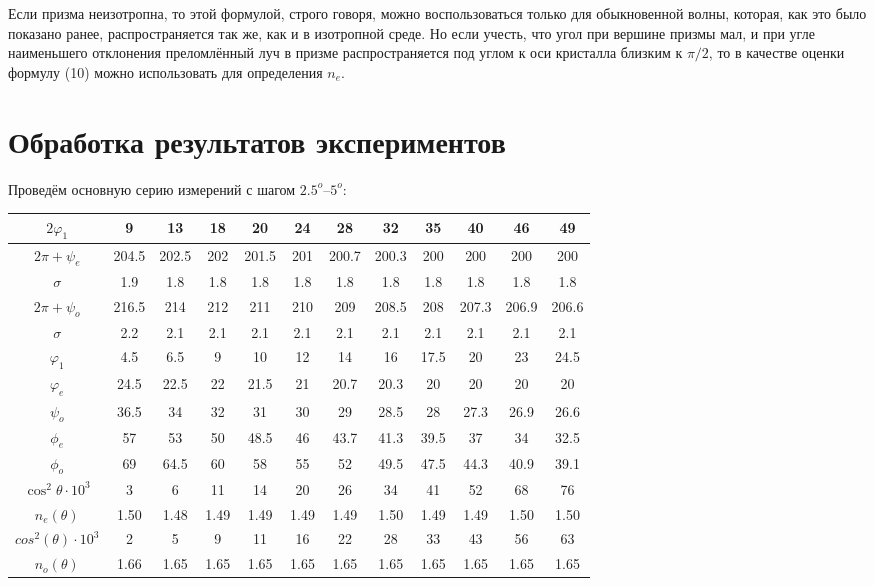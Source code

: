 \documentclass[10pt, a4paper]{article}
\begin{document}
Если призма неизотропна, то этой формулой, строго говоря, можно воспользоваться только для обыкновенной волны, которая, как это было показано ранее, распространяется так же, как и в изотропной среде. Но если учесть, что угол при вершине призмы мал, и при угле наименьшего отклонения преломлённый луч в призме распространяется под углом к оси кристалла близким к $\pi / 2$, то в качестве оценки формулу (10) можно использовать для определения $n_e$.
	\section*{Обработка результатов экспериментов}
	Проведём основную серию измерений с шагом $2.5^o \text{--} 5^o$:
	\begin{table}[H]
	\centering
	\begin{tabular}{|c|c|c|c|c|c|c|c|c|c|c|c|}  \hline
	$2 \varphi_1$ & 9 & 13 & 18 & 20 & 24 & 28 & 32 & 35 & 40 & 46 & 49 \\\hline
	$2 \pi + \psi_e$ & 204.5 & 202.5 & 202 & 201.5 & 201 & 200.7 & 200.3 & 200 & 200 & 200 & 200 \\\hline
	$\sigma$ & 1.9 & 1.8 & 1.8 & 1.8 & 1.8 & 1.8 & 1.8 & 1.8 & 1.8 & 1.8 & 1.8 \\\hline
	$2\pi+ \psi_o$ & 216.5 & 214 & 212 & 211 & 210 & 209 & 208.5 & 208 & 207.3 & 206.9 & 206.6 \\\hline
	$\sigma$ & 2.2 & 2.1 & 2.1 & 2.1 & 2.1 & 2.1 & 2.1 & 2.1 & 2.1 & 2.1 & 2.1 \\\hline
	$\varphi_1$ & 4.5 & 6.5 & 9 & 10 & 12 & 14 & 16 & 17.5 & 20 & 23 & 24.5 \\\hline
	$\varphi_e$ & 24.5 & 22.5 & 22 & 21.5 & 21 & 20.7 & 20.3 & 20 & 20 & 20 & 20 \\\hline
	$\psi_o$ & 36.5 & 34 & 32 & 31 & 30 & 29 & 28.5 & 28 & 27.3 & 26.9 & 26.6 \\\hline
	$\phi_e$ & 57 & 53 & 50 & 48.5 & 46 & 43.7 & 41.3 & 39.5 & 37 & 34 & 32.5 \\\hline
	$\phi_o$ & 69 & 64.5 & 60 & 58 & 55 & 52 & 49.5 & 47.5 & 44.3 & 40.9 & 39.1 \\\hline
	$\cos^2 \theta \cdot 10^3$ & 3 & 6 & 11 & 14 & 20 & 26 & 34 & 41 & 52 & 68 & 76 \\\hline
	$n_e(\theta)$ & 1.50 & 1.48 & 1.49 & 1.49 & 1.49 & 1.49 & 1.50 & 1.49 & 1.49 & 1.50 & 1.50 \\\hline
	$cos^2(\theta) \cdot 10^3$ & 2 & 5 & 9 & 11 & 16 & 22 & 28 & 33 & 43 & 56 & 63 \\\hline
	$n_o (\theta)$ & 1.66 & 1.65 & 1.65 & 1.65 & 1.65 & 1.65 & 1.65 & 1.65 & 1.65 & 1.65 & 1.65 \\\hline
	\end{tabular}
	\end{table}
\end{document}
